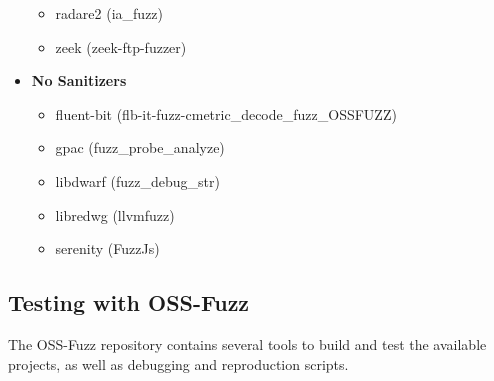 \begin{itemize}
\begin{itemize}
    \item radare2 (ia\_fuzz)
    \item zeek (zeek-ftp-fuzzer)
  \end{itemize}
  \item \textbf{No Sanitizers}
  \begin{itemize}
    \item fluent-bit (flb-it-fuzz-cmetric\_decode\_fuzz\_OSSFUZZ)
    \item gpac (fuzz\_probe\_analyze)
    \item libdwarf (fuzz\_debug\_str)
    \item libredwg (llvmfuzz)
    \item serenity (FuzzJs)
  \end{itemize}
\end{itemize}





\subsection{Testing with OSS-Fuzz}
The OSS-Fuzz repository contains several tools to build and test the available projects, as well as debugging and reproduction scripts.

